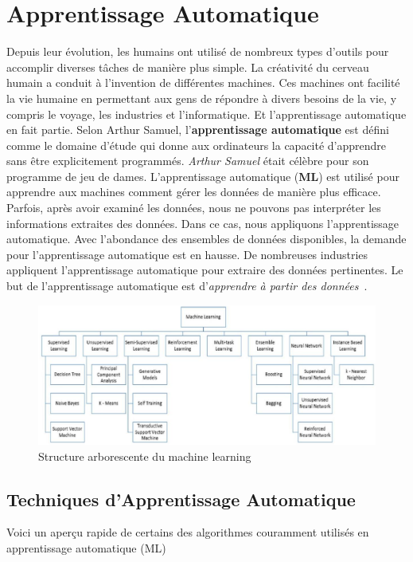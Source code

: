 \section{Apprentissage Automatique}
Depuis leur évolution, les humains ont utilisé de nombreux types d'outils pour accomplir diverses tâches de manière plus simple. La créativité du cerveau humain a conduit à l'invention de différentes machines. Ces machines ont facilité la vie humaine en permettant aux gens de répondre à divers besoins de la vie, y compris le voyage, les industries et l'informatique. Et l'apprentissage automatique en fait partie. Selon Arthur Samuel, l'\textbf{apprentissage automatique} est défini comme le domaine d'étude qui donne aux ordinateurs la capacité d'apprendre sans être explicitement programmés. \textit{Arthur Samuel} était célèbre pour son programme de jeu de dames. L'apprentissage automatique (\textbf{ML}) est utilisé pour apprendre aux machines comment gérer les données de manière plus efficace. Parfois, après avoir examiné les données, nous ne pouvons pas interpréter les informations extraites des données. Dans ce cas, nous appliquons l'apprentissage automatique. Avec l'abondance des ensembles de données disponibles, la demande pour l'apprentissage automatique est en hausse. De nombreuses industries appliquent l'apprentissage automatique pour extraire des données pertinentes. Le but de l'apprentissage automatique est d'\textit{apprendre à partir des données}~\cite{Machine2020Batta}.
\begin{figure}[!h]
	\centering
	\includegraphics[width=1\linewidth]{images/machineLearningType}
	\caption{Structure arborescente du machine learning ~\cite{mltree}}
	\label{fig:machinelearningtype}
\end{figure}

\subsection{Techniques d'Apprentissage Automatique}
Voici un aperçu rapide de certains des algorithmes couramment utilisés en apprentissage automatique (ML)

